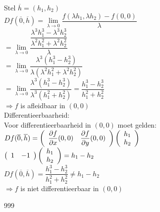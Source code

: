 \documentclass[a4paper]{article}
\newcommand{\dlim}{\lim\limits}
\begin{document}
Stel $\overline{h} = (h_1,h_2)$\\

$Df(\overline{0}, \overline{h}) = \dlim_{\lambda \rightarrow 0} \dfrac{f(\lambda h_1, \lambda h_2) - f(0,0)}{\lambda}$\\

$= \dlim_{\lambda \rightarrow 0} \dfrac{\dfrac{\lambda^3 h_1^3 - \lambda^3 h_2^3}{\lambda^2 h_1^2 + \lambda^2 h_2^2}}{\lambda}$\\

$= \dlim_{\lambda \rightarrow 0} \dfrac{\lambda^3 (h_1^3 - h_2^3)}{\lambda (\lambda^2 h_1^2 + \lambda^2 h_2^2)}$\\

$= \dlim_{\lambda \rightarrow 0} \dfrac{\lambda^3 (h_1^3 - h_2^3)}{\lambda^3 (h_1^2 + h_2^2)} = \dfrac{h_1^3 - h_2^3}{h_1^2 + h_2^2}$\\

$\Rightarrow f$ is afleidbaar in $(0,0)$\\

Differentieerbaarheid:\\

Voor differentieerbaarheid in $(0,0)$ moet gelden: $Df(\overline{0}, \overline{h}) = \left(\begin{array}{c c} \dfrac{\partial f}{\partial x}(0,0) & \dfrac{\partial f}{\partial y}(0,0) \end{array}\right) \left(\begin{array}{c} h_1 \\ h_2 \end{array}\right)$\\

$\left(\begin{array}{c c} 1 & -1 \end{array}\right) \left(\begin{array}{c} h_1 \\ h_2 \end{array}\right) = h_1 - h_2$\\

$Df(\overline{0}, \overline{h}) = \dfrac{h_1^3 - h_2^3}{h_1^2 + h_2^2} \neq h_1 - h_2$\\

$\Rightarrow f$ is niet differentieerbaar in $(0,0)$\\

\begin{thebibliography}{999}
\end{thebibliography}
\end{document}
